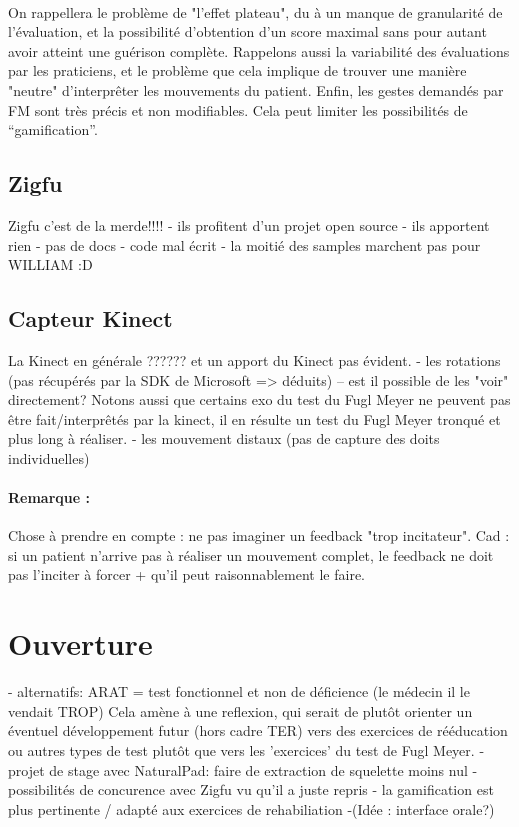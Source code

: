 \documentclass[french,12pt]{report}
\begin{document}
\paragraph{}
On rappellera le problème de "l'effet plateau", du à un manque de granularité de l'évaluation, et la possibilité
d'obtention d'un score maximal sans pour autant avoir atteint une guérison complète. Rappelons aussi la variabilité
des évaluations par les praticiens, et le problème que cela implique de trouver une manière "neutre" d'interprêter
les mouvements du patient.
Enfin, les gestes demandés par FM sont très précis et non modifiables. Cela peut limiter les possibilités de “gamification”.
		
			\subsection{Zigfu}	
		Zigfu c'est de la merde!!!!
		- ils profitent d'un projet open source
		- ils apportent rien
		- pas de docs
		- code mal écrit
		- la moitié des samples marchent pas pour WILLIAM :D
		
		\subsection{Capteur Kinect}
		La Kinect en générale ??????  et un apport du Kinect pas évident.
		- les rotations (pas récupérés par la SDK de Microsoft => déduits)
		  -- est il possible de les "voir" directement?  
Notons aussi que certains exo du test du Fugl Meyer ne peuvent pas être fait/interprêtés par la kinect, il en résulte
un test du Fugl Meyer tronqué et plus long à réaliser.
		- les mouvement distaux (pas de capture des doits individuelles)

\paragraph{Remarque :\\}
Chose à prendre en compte : ne pas imaginer un feedback "trop incitateur". Cad : si un patient n'arrive pas à 
réaliser un mouvement complet, le feedback ne doit pas l'inciter à forcer + qu’il peut raisonnablement le faire.
		
		\section{Ouverture}	%
		
		- alternatifs: ARAT = test fonctionnel et non de déficience (le médecin il le vendait TROP)
Cela amène à une reflexion, qui serait de plutôt orienter un éventuel développement futur (hors cadre TER) vers
des exercices de rééducation ou autres types de test plutôt que vers les 'exercices' du test de Fugl Meyer.
		- projet de stage avec NaturalPad: faire de extraction de squelette moins nul
		- possibilités de concurence avec Zigfu vu qu'il a juste repris 
		- la gamification est plus pertinente / adapté aux exercices de rehabiliation 
		-(Idée : interface orale?)
		
\end{document}
